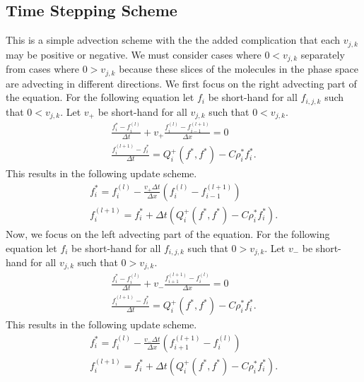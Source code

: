\documentclass{article}
\begin{document}
\subsection{Time Stepping Scheme}
This is a simple advection scheme with the the added complication that each $v_{j,k}$ may be positive or negative. We must consider cases where $0 < v_{j,k}$ separately from cases where $0 > v_{j,k}$ because these slices of the molecules in the phase space are advecting in different directions. We first focus on the right advecting part of the equation. For the following equation let $f_i$ be short-hand for all $f_{i,j,k}$ such that $0 < v_{j,k}$. Let $v_+$ be short-hand for all $v_{j,k}$ such that $0 < v_{j,k}$.
\begin{gather*}
  \frac{f_i^* - f_i^{(l)}}{\Delta t} + v_+ \frac{f_i^{(l)} - f_{i-1}^{(l+1)}}{\Delta x} = 0\\
  \frac{f_i^{(l+1)} - f^*_i}{\Delta t} = Q_i^+(f^*,f^*) - C \rho_i^* f^*_i.
\end{gather*}
This results in the following update scheme.
\begin{gather*}
  f_i^* = f_i^{(l)} - \frac{v_+ \Delta t}{\Delta x} \left( f_i^{(l)} - f_{i-1}^{(l+1)} \right)\\
  f_i^{(l+1)} = f^*_i + \Delta t \left( Q_i^+(f^*,f^*) - C \rho_i^* f^*_i \right).
\end{gather*}
Now, we focus on the left advecting part of the equation. For the following equation let $f_i$ be short-hand for all $f_{i,j,k}$ such that $0 > v_{j,k}$. Let $v_-$ be short-hand for all $v_{j,k}$ such that $0 > v_{j,k}$.
\begin{gather*}
  \frac{f_i^* - f_i^{(l)}}{\Delta t} + v_- \frac{f_{i+1}^{(l+1)} - f_{i}^{(l)}}{\Delta x} = 0\\
  \frac{f_i^{(l+1)} - f^*_i}{\Delta t} = Q_i^+(f^*,f^*) - C \rho_i^* f^*_i.
\end{gather*}
This results in the following update scheme.
\begin{gather*}
  f_i^* = f_i^{(l)} - \frac{v_- \Delta t}{\Delta x} \left( f_{i+1}^{(l+1)} - f_{i}^{(l)} \right)\\
  f_i^{(l+1)} = f^*_i + \Delta t \left( Q_i^+(f^*,f^*) - C \rho_i^* f^*_i \right).
\end{gather*}
\end{document}
